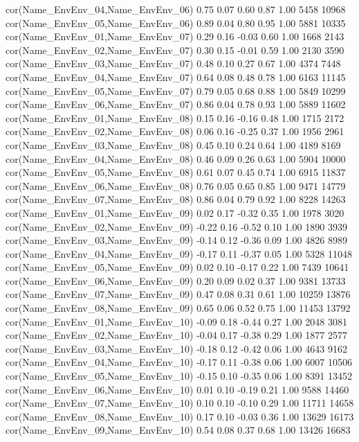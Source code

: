 \documentclass[a4paper,12pt,twoside]{article}
\begin{document}
\begin{Routput}
cor(Name_EnvEnv_04,Name_EnvEnv_06)  0.75      0.07     0.60     0.87 1.00     5458    10968
cor(Name_EnvEnv_05,Name_EnvEnv_06)  0.89      0.04     0.80     0.95 1.00     5881    10335
cor(Name_EnvEnv_01,Name_EnvEnv_07)  0.29      0.16    -0.03     0.60 1.00     1668     2143
cor(Name_EnvEnv_02,Name_EnvEnv_07)  0.30      0.15    -0.01     0.59 1.00     2130     3590
cor(Name_EnvEnv_03,Name_EnvEnv_07)  0.48      0.10     0.27     0.67 1.00     4374     7448
cor(Name_EnvEnv_04,Name_EnvEnv_07)  0.64      0.08     0.48     0.78 1.00     6163    11145
cor(Name_EnvEnv_05,Name_EnvEnv_07)  0.79      0.05     0.68     0.88 1.00     5849    10299
cor(Name_EnvEnv_06,Name_EnvEnv_07)  0.86      0.04     0.78     0.93 1.00     5889    11602
cor(Name_EnvEnv_01,Name_EnvEnv_08)  0.15      0.16    -0.16     0.48 1.00     1715     2172
cor(Name_EnvEnv_02,Name_EnvEnv_08)  0.06      0.16    -0.25     0.37 1.00     1956     2961
cor(Name_EnvEnv_03,Name_EnvEnv_08)  0.45      0.10     0.24     0.64 1.00     4189     8169
cor(Name_EnvEnv_04,Name_EnvEnv_08)  0.46      0.09     0.26     0.63 1.00     5904    10000
cor(Name_EnvEnv_05,Name_EnvEnv_08)  0.61      0.07     0.45     0.74 1.00     6915    11837
cor(Name_EnvEnv_06,Name_EnvEnv_08)  0.76      0.05     0.65     0.85 1.00     9471    14779
cor(Name_EnvEnv_07,Name_EnvEnv_08)  0.86      0.04     0.79     0.92 1.00     8228    14263
cor(Name_EnvEnv_01,Name_EnvEnv_09)  0.02      0.17    -0.32     0.35 1.00     1978     3020
cor(Name_EnvEnv_02,Name_EnvEnv_09) -0.22      0.16    -0.52     0.10 1.00     1890     3939
cor(Name_EnvEnv_03,Name_EnvEnv_09) -0.14      0.12    -0.36     0.09 1.00     4826     8989
cor(Name_EnvEnv_04,Name_EnvEnv_09) -0.17      0.11    -0.37     0.05 1.00     5328    11048
cor(Name_EnvEnv_05,Name_EnvEnv_09)  0.02      0.10    -0.17     0.22 1.00     7439    10641
cor(Name_EnvEnv_06,Name_EnvEnv_09)  0.20      0.09     0.02     0.37 1.00     9381    13733
cor(Name_EnvEnv_07,Name_EnvEnv_09)  0.47      0.08     0.31     0.61 1.00    10259    13876
cor(Name_EnvEnv_08,Name_EnvEnv_09)  0.65      0.06     0.52     0.75 1.00    11453    13792
cor(Name_EnvEnv_01,Name_EnvEnv_10) -0.09      0.18    -0.44     0.27 1.00     2048     3081
cor(Name_EnvEnv_02,Name_EnvEnv_10) -0.04      0.17    -0.38     0.29 1.00     1877     2577
cor(Name_EnvEnv_03,Name_EnvEnv_10) -0.18      0.12    -0.42     0.06 1.00     4643     9162
cor(Name_EnvEnv_04,Name_EnvEnv_10) -0.17      0.11    -0.38     0.06 1.00     6007    10506
cor(Name_EnvEnv_05,Name_EnvEnv_10) -0.15      0.10    -0.35     0.06 1.00     8391    13452
cor(Name_EnvEnv_06,Name_EnvEnv_10)  0.01      0.10    -0.19     0.21 1.00     9588    14460
cor(Name_EnvEnv_07,Name_EnvEnv_10)  0.10      0.10    -0.10     0.29 1.00    11711    14658
cor(Name_EnvEnv_08,Name_EnvEnv_10)  0.17      0.10    -0.03     0.36 1.00    13629    16173
cor(Name_EnvEnv_09,Name_EnvEnv_10)  0.54      0.08     0.37     0.68 1.00    13426    16683


\end{Routput}
\end{document}
